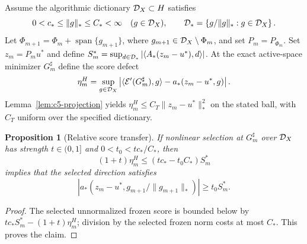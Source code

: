 \documentclass[11pt]{article}
\newtheorem{proposition}[theorem]{Proposition}
\theoremstyle{remark}\newtheorem{remark}[theorem]{Remark}
\begin{document}
Assume the algorithmic dictionary $\mathcal D_X\subset H$ satisfies
\begin{equation}
 0<c_*\le\|g\|_*\le C_*<\infty\quad(g\in\mathcal D_X),
\qquad \mathcal D_* = \left\{g/\|g\|_*:g\in\mathcal D_X\right\}.
 \label{eq:c5-bridge}
\end{equation}
Let $\Phi_{m+1}=\Phi_m+\operatorname{span}\{g_{m+1}\}$, where
$g_{m+1}\in\mathcal D_X\setminus\Phi_m$, and set $P_m=P_{\Phi_m}$.
Set $z_m=P_mu^*$ and define
$S_m^*=\sup_{d\in\mathcal D_*}|\langle A_*(z_m-u^*),d\rangle|$.  At the exact
active-space minimizer $G_m^\sharp$ define the score defect
\[
 \eta_m^H=\sup_{g\in\mathcal D_X}
 \left|\langle\mathcal E'(G_m^\sharp),g\rangle-a_*(z_m-u^*,g)\right|.
\]
Lemma~\ref{lem:c5-projection} yields
$\eta_m^H\le C_{T}\|z_m-u^*\|_*^2$ on the stated ball, with $C_T$ uniform
over the specified dictionary.

\begin{proposition}[Relative score transfer]
\label{prop:c5-transfer}
If nonlinear selection at $G_m^\sharp$ over $\mathcal D_X$ has strength
$t\in(0,1]$ and $0<t_0<tc_*/C_*$, then
\begin{equation}
 (1+t)\eta_m^H\le (tc_*-t_0C_*)S_m^*
 \label{eq:c5-relative}
\end{equation}
implies that the selected direction satisfies
\[
 \left|a_*(z_m-u^*,g_{m+1}/\|g_{m+1}\|_*)\right|\ge t_0S_m^*.
\]
\end{proposition}
\begin{proof}
The selected unnormalized frozen score is bounded below by
$t c_*S_m^*-(1+t)\eta_m^H$; division by the selected frozen norm costs at most
$C_*$.  This proves the claim.
\end{proof}
\end{document}
